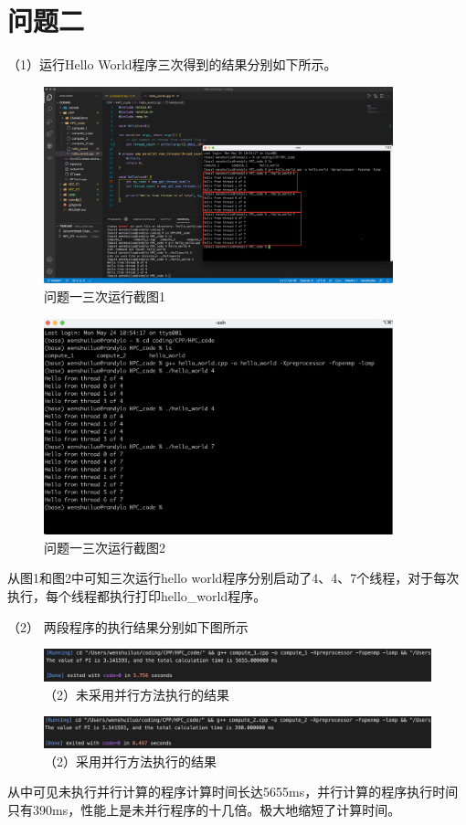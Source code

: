 \documentclass[12pt]{article}
\begin{document}
\section{问题二}
		（1）运行Hello World程序三次得到的结果分别如下所示。
		\begin{figure}[htbp]
			\centering
			\includegraphics[width=0.9\textwidth]{hello_world三次运行.png}
			\caption{问题一三次运行截图1}
			\label{fig:pro2_1_1}
		\end{figure}
		\begin{figure}[htbp]
			\centering
			\includegraphics[width=0.9\textwidth]{pro1.png}
			\caption{问题一三次运行截图2}
			\label{fig:pro2_1_2}
		\end{figure}

		从图1和图2中可知三次运行hello world程序分别启动了4、4、7个线程，对于每次执行，每个线程都执行打印hello\_world程序。		

		（2） 两段程序的执行结果分别如下图所示
		\begin{figure}[htbp]
			\centering
			\includegraphics[width=1.0\textwidth]{result4.png}
			\caption{（2）未采用并行方法执行的结果}
		\end{figure}
		
		\begin{figure}[htbp]
			\centering
			\includegraphics[width=1.0\textwidth]{result5.png}
			\caption{（2）采用并行方法执行的结果}
		\end{figure}

		从中可见未执行并行计算的程序计算时间长达5655ms，并行计算的程序执行时间只有390ms，性能上是未并行程序的十几倍。极大地缩短了计算时间。

	
\end{document}
